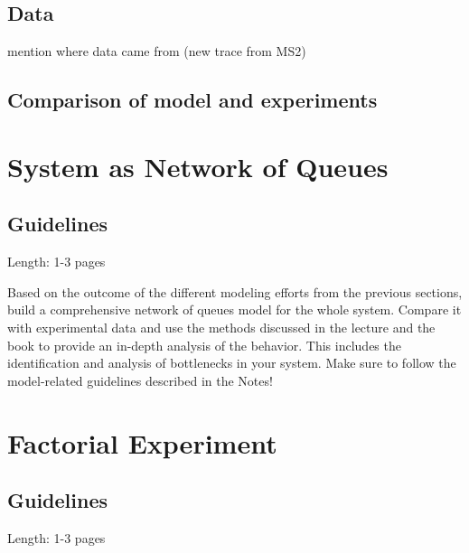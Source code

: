 \documentclass[11pt]{article}
\begin{document}
\subsection{Data}

mention where data came from (new trace from MS2)

\subsection{Comparison of model and experiments}


\clearpage
\section{System as Network of Queues}\label{sec:network-of-queues}

\subsection{Guidelines}
Length: 1-3 pages

Based on the outcome of the different modeling efforts from the previous sections, build a comprehensive network of queues model for the whole system. Compare it with experimental data and use the methods discussed in the lecture and the book to provide an in-depth analysis of the behavior. This includes the identification and analysis of bottlenecks in your system. Make sure to follow the model-related guidelines described in the Notes!


\clearpage
\section{Factorial Experiment}\label{sec:2k-experiment}

\subsection{Guidelines}
Length: 1-3 pages
\end{document}
